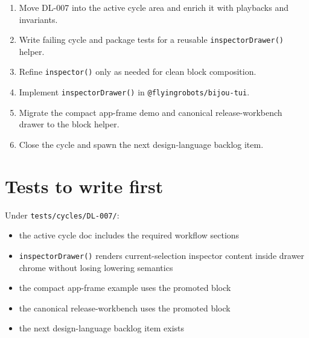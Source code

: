\begin{enumerate}
\def\labelenumi{\arabic{enumi}.}
\tightlist
\item
  Move DL-007 into the active cycle area and enrich it with playbacks and invariants.
\item
  Write failing cycle and package tests for a reusable \texttt{i\allowbreak{}n\allowbreak{}s\allowbreak{}p\allowbreak{}e\allowbreak{}c\allowbreak{}t\allowbreak{}o\allowbreak{}r\allowbreak{}D\allowbreak{}r\allowbreak{}a\allowbreak{}w\allowbreak{}e\allowbreak{}r\allowbreak{}(\allowbreak{})} helper.
\item
  Refine \texttt{i\allowbreak{}n\allowbreak{}s\allowbreak{}p\allowbreak{}e\allowbreak{}c\allowbreak{}t\allowbreak{}o\allowbreak{}r\allowbreak{}(\allowbreak{})} only as needed for clean block composition.
\item
  Implement \texttt{i\allowbreak{}n\allowbreak{}s\allowbreak{}p\allowbreak{}e\allowbreak{}c\allowbreak{}t\allowbreak{}o\allowbreak{}r\allowbreak{}D\allowbreak{}r\allowbreak{}a\allowbreak{}w\allowbreak{}e\allowbreak{}r\allowbreak{}(\allowbreak{})} in \texttt{@\allowbreak{}f\allowbreak{}l\allowbreak{}y\allowbreak{}i\allowbreak{}n\allowbreak{}g\allowbreak{}r\allowbreak{}o\allowbreak{}b\allowbreak{}o\allowbreak{}t\allowbreak{}s\allowbreak{}/\allowbreak{}b\allowbreak{}i\allowbreak{}j\allowbreak{}o\allowbreak{}u\allowbreak{}-\allowbreak{}t\allowbreak{}u\allowbreak{}i}.
\item
  Migrate the compact app-frame demo and canonical release-workbench drawer to the block helper.
\item
  Close the cycle and spawn the next design-language backlog item.
\end{enumerate}

\section{Tests to write first}\label{record-174-tests-to-write-first}

Under \texttt{t\allowbreak{}e\allowbreak{}s\allowbreak{}t\allowbreak{}s\allowbreak{}/\allowbreak{}c\allowbreak{}y\allowbreak{}c\allowbreak{}l\allowbreak{}e\allowbreak{}s\allowbreak{}/\allowbreak{}D\allowbreak{}L\allowbreak{}-\allowbreak{}0\allowbreak{}0\allowbreak{}7\allowbreak{}/}:

\begin{itemize}
\tightlist
\item
  the active cycle doc includes the required workflow sections
\item
  \texttt{i\allowbreak{}n\allowbreak{}s\allowbreak{}p\allowbreak{}e\allowbreak{}c\allowbreak{}t\allowbreak{}o\allowbreak{}r\allowbreak{}D\allowbreak{}r\allowbreak{}a\allowbreak{}w\allowbreak{}e\allowbreak{}r\allowbreak{}(\allowbreak{})} renders current-selection inspector content inside drawer chrome without losing lowering semantics
\item
  the compact app-frame example uses the promoted block
\item
  the canonical release-workbench uses the promoted block
\item
  the next design-language backlog item exists
\end{itemize}


